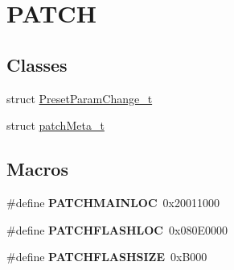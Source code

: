 \hypertarget{group__PATCH}{}\section{P\+A\+T\+CH}
\label{group__PATCH}
\subsection*{Classes}
\begin{DoxyCompactItemize}
\item 
struct \hyperlink{structPresetParamChange__t}{Preset\+Param\+Change\+\_\+t}
\item 
struct \hyperlink{structpatchMeta__t}{patch\+Meta\+\_\+t}
\end{DoxyCompactItemize}
\subsection*{Macros}
\begin{DoxyCompactItemize}
\item 
\#define {\bfseries P\+A\+T\+C\+H\+M\+A\+I\+N\+L\+OC}~0x20011000\hypertarget{group__PATCH_ga612d3491215cfbb4cb81096c67d86bcb}{}\label{group__PATCH_ga612d3491215cfbb4cb81096c67d86bcb}

\item 
\#define {\bfseries P\+A\+T\+C\+H\+F\+L\+A\+S\+H\+L\+OC}~0x080\+E0000\hypertarget{group__PATCH_gab25c2d48c76822ed42c7ae1b89ad1b29}{}\label{group__PATCH_gab25c2d48c76822ed42c7ae1b89ad1b29}

\item 
\#define {\bfseries P\+A\+T\+C\+H\+F\+L\+A\+S\+H\+S\+I\+ZE}~0x\+B000\hypertarget{group__PATCH_ga4d2d902e39ddaef78fac56b424db1fbf}{}\label{group__PATCH_ga4d2d902e39ddaef78fac56b424db1fbf}

\end{DoxyCompactItemize}
